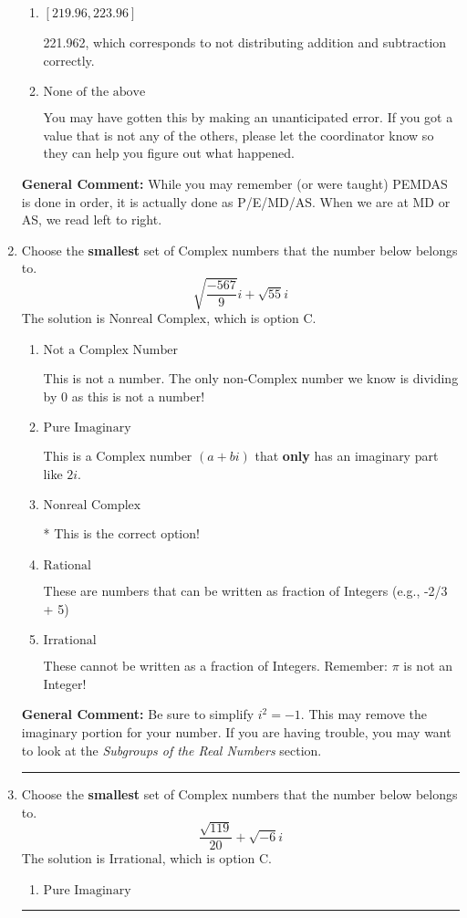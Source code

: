 \documentclass{extbook}[14pt]
\newcommand{\litem}[1]{\item #1

\rule{\textwidth}{0.4pt}}
\begin{document}
\begin{enumerate}
{\begin{enumerate}[label=\Alph*.]
* -207.846, which is the correct option.
\item \( [219.96, 223.96] \)

 221.962, which corresponds to not distributing addition and subtraction correctly.
\item \( \text{None of the above} \)

 You may have gotten this by making an unanticipated error. If you got a value that is not any of the others, please let the coordinator know so they can help you figure out what happened.
\end{enumerate}

\textbf{General Comment:} While you may remember (or were taught) PEMDAS is done in order, it is actually done as P/E/MD/AS. When we are at MD or AS, we read left to right.
}
\litem{
Choose the \textbf{smallest} set of Complex numbers that the number below belongs to.
\[ \sqrt{\frac{-567}{9}} i+\sqrt{55}i \]The solution is \( \text{Nonreal Complex} \), which is option C.\begin{enumerate}[label=\Alph*.]
\item \( \text{Not a Complex Number} \)

This is not a number. The only non-Complex number we know is dividing by 0 as this is not a number!
\item \( \text{Pure Imaginary} \)

This is a Complex number $(a+bi)$ that \textbf{only} has an imaginary part like $2i$.
\item \( \text{Nonreal Complex} \)

* This is the correct option!
\item \( \text{Rational} \)

These are numbers that can be written as fraction of Integers (e.g., -2/3 + 5)
\item \( \text{Irrational} \)

These cannot be written as a fraction of Integers. Remember: $\pi$ is not an Integer!
\end{enumerate}

\textbf{General Comment:} Be sure to simplify $i^2 = -1$. This may remove the imaginary portion for your number. If you are having trouble, you may want to look at the \textit{Subgroups of the Real Numbers} section.
}
\litem{
Choose the \textbf{smallest} set of Complex numbers that the number below belongs to.
\[ \frac{\sqrt{119}}{20}+\sqrt{-6}i \]The solution is \( \text{Irrational} \), which is option C.\begin{enumerate}[label=\Alph*.]
\item \( \text{Pure Imaginary} \)


\end{enumerate}}
\end{enumerate}
\end{document}
